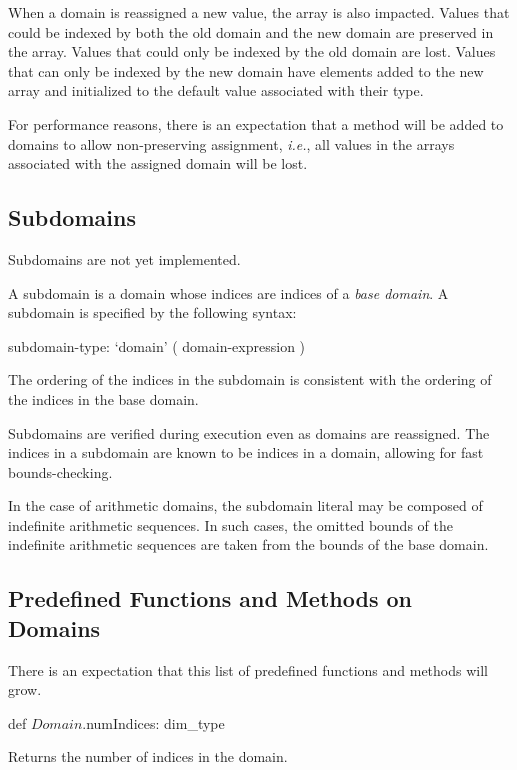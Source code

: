 When a domain is reassigned a new value, the array is also impacted.
Values that could be indexed by both the old domain and the new domain
are preserved in the array.  Values that could only be indexed by the
old domain are lost.  Values that can only be indexed by the new
domain have elements added to the new array and initialized to the
default value associated with their type.

For performance reasons, there is an expectation that a method will be
added to domains to allow non-preserving assignment, {\em i.e.}, all
values in the arrays associated with the assigned domain will be lost.

\subsection{Subdomains}
\label{Subdomains}

\begin{status}
Subdomains are not yet implemented.
\end{status}

A subdomain is a domain whose indices are indices of a {\em base
  domain}.  A subdomain is specified by the following syntax:
\begin{syntax}
subdomain-type:
  `domain' ( domain-expression )
\end{syntax}
The ordering of the indices in the subdomain is consistent with the
ordering of the indices in the base domain.

Subdomains are verified during execution even as domains are
reassigned.  The indices in a subdomain are known to be indices in a
domain, allowing for fast bounds-checking.

In the case of arithmetic domains, the subdomain literal may be
composed of indefinite arithmetic sequences.  In such cases, the
omitted bounds of the indefinite arithmetic sequences are taken from
the bounds of the base domain.

\subsection{Predefined Functions and Methods on Domains}

There is an expectation that this list of predefined functions and
methods will grow.

\begin{protohead}
def $Domain$.numIndices: dim_type
\end{protohead}
\begin{protobody}
Returns the number of indices in the domain.
\end{protobody}

